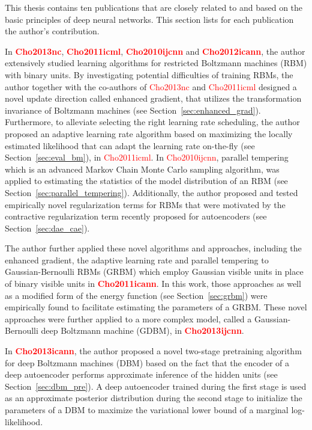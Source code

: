 \documentclass{now}
\newcommand{\alert}[1]{\textcolor{red}{#1}}
\newcommand{\citepub}[1]{\alert{#1}}
\begin{document}
This thesis contains ten publications that are closely
related to and based on the basic principles of deep neural
networks.  This section lists for each publication the
author's contribution.

In \textbf{\citepub{Cho2013nc}},
\textbf{\citepub{Cho2011icml}},
\textbf{\citepub{Cho2010ijcnn}} and
\textbf{\citepub{Cho2012icann}}, the
author extensively studied learning algorithms for
restricted Boltzmann machines (RBM) with binary units. By
investigating potential difficulties of training RBMs, the
author together with the co-authors of
\citepub{Cho2013nc}
and \citepub{Cho2011icml} designed a novel update
direction called enhanced gradient, that utilizes the
transformation invariance of Boltzmann machines (see
Section~\ref{sec:enhanced_grad}). Furthermore, to alleviate
selecting the right learning rate scheduling, the author
proposed an adaptive learning rate algorithm based on
maximizing the locally estimated likelihood that can adapt the learning
rate on-the-fly (see Section~\ref{sec:eval_bm}), in
\citepub{Cho2011icml}. In
\citepub{Cho2010ijcnn}, parallel
tempering which is an advanced Markov Chain Monte Carlo
sampling algorithm, was applied to estimating the statistics
of the model distribution of an RBM (see
Section~\ref{sec:parallel_tempering}). Additionally, the
author proposed and tested empirically novel regularization
terms for RBMs that were motivated by the 
contractive regularization term recently proposed for autoencoders (see
Section~\ref{sec:dae_cae}).

The author further applied these novel algorithms and
approaches, including the enhanced gradient, the adaptive
learning rate and parallel tempering to Gaussian-Bernoulli
RBMs (GRBM) which employ Gaussian visible units in place of
binary visible units in \textbf{\citepub{Cho2011icann}}. In this
work, those approaches as well as a modified form of the
energy function (see Section~\ref{sec:grbm}) were
empirically found to facilitate estimating the parameters of
a GRBM.  These novel approaches were further applied to a
more complex model, called a Gaussian-Bernoulli deep
Boltzmann machine (GDBM), in \textbf{\citepub{Cho2013ijcnn}}.

In \textbf{\citepub{Cho2013icann}}, the author proposed a
novel two-stage pretraining algorithm for deep Boltzmann
machines (DBM) based on the fact that the encoder of a deep
autoencoder performs approximate inference of the hidden
units (see Section~\ref{sec:dbm_pre}).  A deep autoencoder
trained during the first stage is used as an approximate
posterior distribution during the second stage to initialize
the parameters of a DBM to maximize the variational lower
bound of a marginal log-likelihood. 
\end{document}
